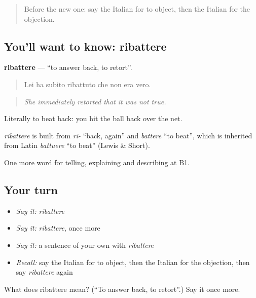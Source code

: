 \begin{quote}
Before the new one: say the Italian for to object, then the Italian for the objection.
\end{quote}

\subsection*{You'll want to know: ribattere}
\textbf{ribattere} — \textquotedblleft{}to answer back, to retort\textquotedblright{}.

\begin{quote}
Lei ha subito ribattuto che non era vero.
\end{quote}

\begin{quote}
\emph{She immediately retorted that it was not true.}
\end{quote}

Literally to beat back: you hit the ball back over the net.

\begin{cousinweb}
\emph{ribattere} is built from \emph{ri-} \textquotedblleft{}back, again\textquotedblright{} and \emph{battere} \textquotedblleft{}to beat\textquotedblright{}, which is inherited from Latin \emph{battuere} \textquotedblleft{}to beat\textquotedblright{} (Lewis \& Short).
\end{cousinweb}

\begin{grammarlens}[title={What you've built}]
One more word for telling, explaining and describing at B1.
\end{grammarlens}

\subsection*{Your turn}
\begin{itemize}
\raggedright
  \item \emph{Say it:} \emph{ribattere}
  \item \emph{Say it:} \emph{ribattere}, once more
  \item \emph{Say it:} a sentence of your own with \emph{ribattere}
  \item \emph{Recall:} say the Italian for to object, then the Italian for the objection, then say \emph{ribattere} again
\end{itemize}

\begin{tcolorbox}[breakable,colback=teal!4,colframe=teal!35!black,title={Before you move on}]
What does ribattere mean? (\textquotedblleft{}To answer back, to retort\textquotedblright{}.) Say it once more.
\end{tcolorbox}
